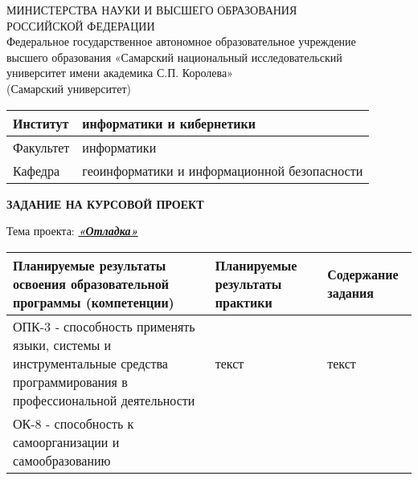 \documentclass[a4paper,14pt,oneside]{extreport}  %
\begin{document}
\begin{titlepage}
		\begin{centering}
		{ МИНИСТЕРСТВА НАУКИ И ВЫСШЕГО ОБРАЗОВАНИЯ \\ РОССИЙСКОЙ ФЕДЕРАЦИИ\\Федеральное государственное автономное образовательное учреждение\\
			высшего образования «Самарский национальный исследовательский\\
			университет имени академика С.П. Королева»\\{(Самарский университет)}\\	}
     	\end{centering}
    	\begin{table}[h]
		\begin{center}
			\begin{tabular}{|p{}|p{}|}
				\hline Институт & информатики и кибернетики \\ \hline
				Факультет & информатики  \\ \hline
				Кафедра & геоинформатики и информационной безопасности \\ \hline
			\end{tabular}
		\end{center}
	    \end{table}
         \centerline {\bf ЗАДАНИЕ НА КУРСОВОЙ ПРОЕКТ}
         {Тема проекта: \underline{ \textbf{\textit{ «Отладка»}}}}
         	\begin{table}[h]
         	\begin{center}
         		\begin{tabular}{|p{}|p{6cm}|p{6cm}|}
         			\hline  
         			Планируемые результаты освоения образовательной программы (компетенции) & Планируемые результаты практики & Содержание задания \\ \hline
         			ОПК-3 ‑ способность применять языки, системы и инструментальные средства программирования в профессиональной деятельности & текст & текст \\ ОК-8 -  способность к самоорганизации и самообразованию & & \\ \hline 
         		\end{tabular}
         	\end{center}
         \end{table}

\end{titlepage}
\end{document}
